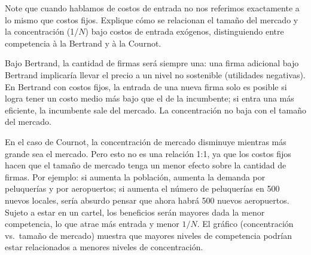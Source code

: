 \question Note que cuando hablamos de costos de entrada no nos referimos exactamente a lo mismo que costos fijos. Explique cómo se relacionan el tamaño del mercado y la concentración (1/$N$) bajo costos de entrada exógenos, distinguiendo entre competencia à la Bertrand y à la Cournot.
\begin{solution}
Bajo Bertrand, la cantidad de firmas será siempre una: una firma adicional bajo Bertrand implicaría llevar el precio a un nivel no sostenible (utilidades negativas). En Bertrand con costos fijos, la entrada de una nueva firma solo es posible si logra tener un costo medio más bajo que el de la incumbente; si entra una más eficiente, la incumbente sale del mercado. La concentración no baja con el tamaño del mercado.

En el caso de Cournot, la concentración de mercado disminuye mientras más grande sea el mercado. Pero esto no es una relación 1:1, ya que los costos fijos hacen que el tamaño de mercado tenga un menor efecto sobre la cantidad de firmas. Por ejemplo: si aumenta la población, aumenta la demanda por peluquerías y por aeropuertos; si aumenta el número de peluquerías en 500 nuevos locales, sería absurdo pensar que ahora habrá 500 nuevos aeropuertos. Sujeto a estar en un cartel, los beneficios serán mayores dada la menor competencia, lo que atrae más entrada y menor $1/N$. El gráfico (concentración vs.\ tamaño de mercado) muestra que mayores niveles de competencia podrían estar relacionados a menores niveles de concentración.

\end{solution}

